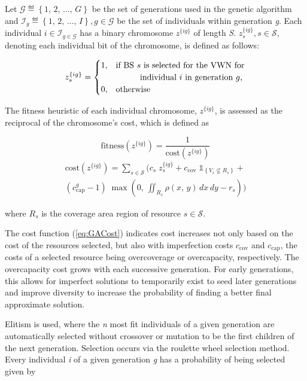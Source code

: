 \documentclass[conference]{IEEEtran}
\begin{document}
Let $\mathcal{G} \eqdef \left\{1,\, 2,\, \ldots,\, G\right\}$ be the set of generations used in the genetic algorithm and $\mathcal{I}_g \eqdef \left\{1,\, 2,\, \ldots,\, I\right\}, g \in \mathcal{G}$ be the set of individuals within generation \textit{g}.  Each individual $i \in \mathcal{I}_{g \in \mathcal{G}}$ has a binary chromosome $z^{\{ig\}}$ of length \textit{S}.  $z_s^{\{ig\}}, s \in \mathcal{S}$, denoting each individual bit of the chromosome, is defined as follows:

\[ z_s^{\{ig\}} =
	\begin{cases}
		1,& \text{if BS $s$ is selected for the VWN for}\\
		& \hspace{0.4in} \text{individual $i$ in generation $g$,}\\
		0,& \text{otherwise}
	\end{cases}
\]

The fitness heuristic of each individual chromosome, $z^{\{ig\}}$, is assessed as the reciprocal of the chromosome's cost, which is defined as

\begin{equation} \label{eq:GAFit}
\text{fitness}\left(z^{\{ig\}}\right) = \frac{1}{\text{cost}\left(z^{\{ig\}}\right)}
\end{equation}
\begin{multline} \label{eq:GACost}
\text{cost}\left(z^{\{ig\}}\right) = \sum_{s \in \mathcal{S}} \Biggl( c_s \; z_s^{\{ig\}} + c_\text{cov} \; \mathbb{1}_{\left\{ V_s \nsubseteq R_s \right\}} + \\ \left(c_\text{cap}^g - 1\right) \; \max\left( 0,\, \iint_{R_s} \rho\left(x,\, y\right)\, dx\, dy - r_s \right) \Biggr)
\end{multline}

\noindent where $R_s$ is the coverage area region of resource $s \in \mathcal{S}$.

The cost function (\ref{eq:GACost}) indicates cost increases not only based on the cost of the resources selected, but also with imperfection costs $c_\text{cov}$ and $c_\text{cap}$, the costs of a selected resource being overcoverage or overcapacity, respectively.  The overcapacity cost grows with each successive generation.  For early generations, this allows for imperfect solutions to temporarily exist to seed later generations and improve diversity to increase the probability of finding a better final approximate solution.

Elitism is used, where the \textit{n} most fit individuals of a given generation are automatically selected without crossover or mutation to be the first children of the next generation.  Selection occurs via the roulette wheel selection method.  Every individual \textit{i} of a given generation \textit{g} has a probability of being selected given by
\end{document}

